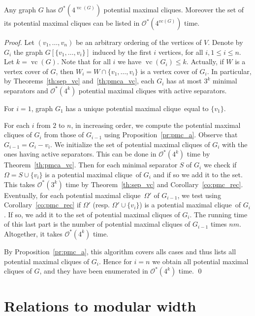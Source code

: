\documentclass{llncs}
\newcommand{\cO}{\mathcal{O}}
\newcommand{\vc}{\operatorname{vc}}
\newcommand{\pmc}{potential maximal clique}
\newcommand{\npmc}{4}
\begin{document}
\begin{theorem}\label{th:pmc_vc}
Any graph $G$ has $\cO^*(\npmc^{\vc(G)})$ \pmc s. Moreover the set of its \pmc s can be listed in $\cO^*(\npmc^{vc(G)})$ time.
\end{theorem}
\begin{proof}
Let $(v_1,\dots, v_n)$ be an arbitrary ordering of the vertices of $V$. Denote by $G_i$ the graph $G[\{v_1, \dots, v_i\}]$ induced by the first $i$ 
vertices, for all $i, 1 \leq i \leq n$. Let $k =  \vc(G)$. Note that for all $i$ we have $\vc(G_i) \leq k$. Actually, if $W$ is a vertex cover of $G$, then $W_i = W \cap \{v_1, \dots, v_i\}$ is a vertex 
cover of $G_i$. In particular, by Theorems~\ref{th:sep_vc} and~\ref{th:pmca_vc}, each $G_i$ has at most $3^k$ minimal separators and $\cO^*(\npmc^k)$ \pmc s with active separators.

For $i = 1$, graph $G_1$ has a unique \pmc\ equal to $\{v_1\}$.

For each $i$ from $2$ to $n$, in increasing order, we compute the \pmc s of $G_i$ from those of $G_{i-1}$ using Proposition~\ref{pr:pmc_a}. 
Observe that $G_{i-1} = G_i - v_i$. We initialize the set of \pmc s of $G_i$ with the ones having active separators. This can be done in $\cO^*(\npmc^k)$ time by Theorem~\ref{th:pmca_vc}.
Then for each minimal separator $S$ of $G_i$ we check if $\Omega = S \cup \{v_i\}$ is a \pmc\ of $G_i$ and if so we add it to the set. 
This takes $\cO^*(3^k)$ time by Theorem~\ref{th:sep_vc} and Corollary~\ref{co:pmc_rec}.
Eventually, for each \pmc\ $\Omega'$ of $G_{i-1}$, we test using Corollary~\ref{co:pmc_rec} if $\Omega'$ (resp. $\Omega' \cup \{v_i\}$) is a \pmc\ of $G_i$. If so, we add it to the set of \pmc s of $G_i$. The running time of this last part is the number of \pmc s of $G_{i-1}$ times $nm$. Altogether, it takes $\cO^*(\npmc^k)$ time.

By Proposition~\ref{pr:pmc_a}, this algorithm  covers alls cases and thus lists all \pmc s of $G_i$. Hence for $i=n$ we obtain all \pmc s of $G$, and they have been enumerated in $\cO^*(\npmc^k)$ time.
\qed
\end{proof}

\section{Relations to modular width}\label{se:mw}
\end{document}
